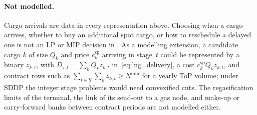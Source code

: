 \paragraph{Not modelled.}
Cargo arrivals are data in every representation above.  Choosing when a
cargo arrives, whether to buy an additional spot cargo, or how to
reschedule a delayed one is not an LP or MIP decision in \gtopt{}.  As
a modelling extension, a candidate cargo $k$ of size $Q_k$ and price
$c^{\mathrm{sp}}_k$ arriving in stage~$t$ could be represented by a
binary $z_{k,t}$, with $D_{\tau,t} = \sum_k Q_k z_{k,t}$
in~\eqref{eq:lng_delivery}, a cost $c^{\mathrm{sp}}_k Q_k z_{k,t}$, and
contract rows such as $\sum_{t \in \mathcal{Y}} \sum_k z_{k,t} \geq
N^{\min}$ for a yearly ToP volume; under SDDP the integer stage
problems would need convexified cuts.  The regasification limits of the
terminal, the link of its send-out to a gas node, and make-up or
carry-forward banks between contract periods are not modelled either.
